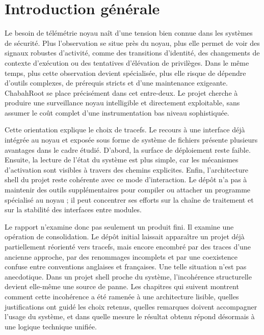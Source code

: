 \documentclass[12pt,a4paper]{report}
\begin{document}
\chapter*{Introduction générale}
Le besoin de télémétrie noyau naît d’une tension bien connue dans les systèmes de sécurité. Plus l’observation se situe près du noyau, plus elle permet de voir des signaux robustes d’activité, comme des transitions d’identité, des changements de contexte d’exécution ou des tentatives d’élévation de privilèges. Dans le même temps, plus cette observation devient spécialisée, plus elle risque de dépendre d’outils complexes, de prérequis stricts et d’une maintenance exigeante. ChabahRoot se place précisément dans cet entre-deux. Le projet cherche à produire une surveillance noyau intelligible et directement exploitable, sans assumer le coût complet d’une instrumentation bas niveau sophistiquée.

Cette orientation explique le choix de tracefs. Le recours à une interface déjà intégrée au noyau et exposée sous forme de système de fichiers présente plusieurs avantages dans le cadre étudié. D’abord, la surface de déploiement reste faible. Ensuite, la lecture de l’état du système est plus simple, car les mécanismes d’activation sont visibles à travers des chemins explicites. Enfin, l’architecture shell du projet reste cohérente avec ce mode d’interaction. Le dépôt n’a pas à maintenir des outils supplémentaires pour compiler ou attacher un programme spécialisé au noyau ; il peut concentrer ses efforts sur la chaîne de traitement et sur la stabilité des interfaces entre modules.

Le rapport n’examine donc pas seulement un produit fini. Il examine une opération de consolidation. Le dépôt initial laissait apparaître un projet déjà partiellement réorienté vers tracefs, mais encore encombré par des traces d’une ancienne approche, par des renommages incomplets et par une coexistence confuse entre conventions anglaises et françaises. Une telle situation n’est pas anecdotique. Dans un projet shell proche du système, l’incohérence structurelle devient elle-même une source de panne. Les chapitres qui suivent montrent comment cette incohérence a été ramenée à une architecture lisible, quelles justifications ont guidé les choix retenus, quelles remarques doivent accompagner l’usage du système, et dans quelle mesure le résultat obtenu répond désormais à une logique technique unifiée.
\end{document}
